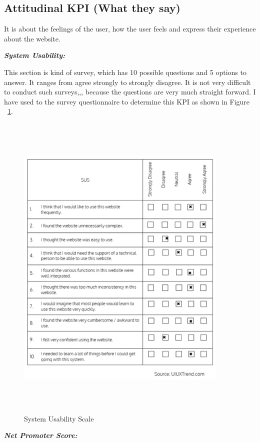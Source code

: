 \subsection{ Attitudinal KPI (What they say)}
It is about the feelings of the user, how the user feels and express their experience about the website. \par
\textbf{\emph{System Usability:}}\par
This section is kind of survey, which has 10 possible questions and 5 options to answer. It ranges from agree strongly to strongly disagree. It is not very difficult to conduct such surveys,,, because the questions are very much straight forward. I have used to the survey questionnaire to determine this KPI as shown in Figure ~\ref{fig:SUS}.\par
\begin{figure}[htbp]
\begin{center}
\includegraphics[width=4in, height=6in]{image.png}
\caption{System Usability Scale}
\label{fig:SUS}
\end{center}
\end{figure}
\textbf{\emph{Net Promoter Score:}}\par
